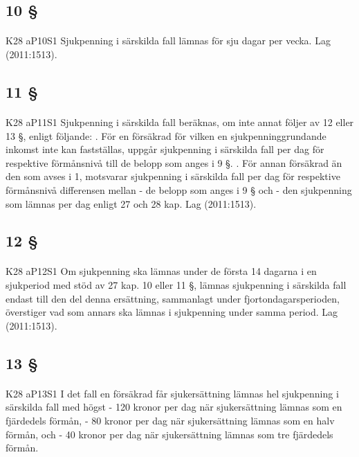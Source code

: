 \documentclass[a4paper,notitlepage,openany,10pt]{book}
\begin{document}
\subsection*{10 §}
\paragraph*{}
{\tiny K28 aP10S1}
Sjukpenning i särskilda fall lämnas för sju dagar per vecka.
Lag (2011:1513).
\subsection*{11 §}
\paragraph*{}
{\tiny K28 aP11S1}
Sjukpenning i särskilda fall beräknas, om inte annat följer av 12 eller 13 §, enligt följande:
. För en försäkrad för vilken en sjukpenninggrundande inkomst inte kan fastställas, uppgår sjukpenning i särskilda fall per dag för respektive förmånsnivå till de belopp som anges i 9 §.
. För annan försäkrad än den som avses i 1, motsvarar sjukpenning i särskilda fall per dag för respektive förmånsnivå differensen mellan
\newline - de belopp som anges i 9 § och
\newline - den sjukpenning som lämnas per dag enligt 27 och 28 kap.
Lag (2011:1513).
\subsection*{12 §}
\paragraph*{}
{\tiny K28 aP12S1}
Om sjukpenning ska lämnas under de första 14 dagarna i en sjukperiod med stöd av 27 kap. 10 eller 11 §, lämnas sjukpenning i särskilda fall endast till den del denna ersättning, sammanlagt under fjortondagarsperioden, överstiger vad som annars ska lämnas i sjukpenning under samma period.
Lag (2011:1513).
\subsection*{13 §}
\paragraph*{}
{\tiny K28 aP13S1}
I det fall en försäkrad får sjukersättning lämnas hel sjukpenning i särskilda fall med högst
\newline - 120 kronor per dag när sjukersättning lämnas som en fjärdedels förmån,
\newline - 80 kronor per dag när sjukersättning lämnas som en halv förmån, och
\newline - 40 kronor per dag när sjukersättning lämnas som tre fjärdedels förmån.
\end{document}
